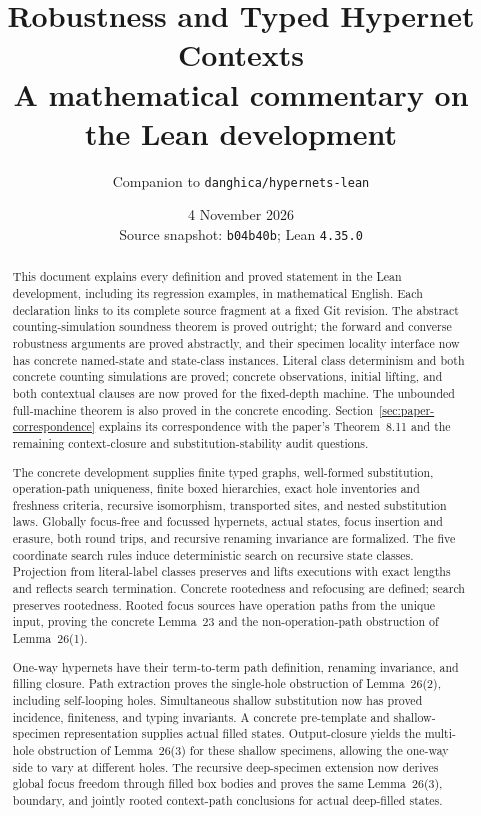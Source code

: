 \documentclass[11pt,a4paper]{article}
\title{Robustness and Typed Hypernet Contexts\\\large A mathematical commentary on the Lean development}
\author{Companion to \texttt{danghica/hypernets-lean}}
\date{4 November 2026\\\small Source snapshot: \texttt{b04b40b}; Lean \texttt{4.35.0}}
\theoremstyle{definition}
\theoremstyle{plain}
\theoremstyle{remark}
\begin{document}
\maketitle
\begin{abstract}
This document explains every definition and proved statement in the Lean development, including its regression examples, in mathematical English. Each declaration links to its complete source fragment at a fixed Git revision. The abstract counting-simulation soundness theorem is proved outright; the forward and converse robustness arguments are proved abstractly, and their specimen locality interface now has concrete named-state and state-class instances. Literal class determinism and both concrete counting simulations are proved; concrete observations, initial lifting, and both contextual clauses are now proved for the fixed-depth machine. The unbounded full-machine theorem is also proved in the concrete encoding. Section~\ref{sec:paper-correspondence} explains its correspondence with the paper's Theorem~8.11 and the remaining context-closure and substitution-stability audit questions.

The concrete development supplies finite typed graphs, well-formed substitution, operation-path uniqueness, finite boxed hierarchies, exact hole inventories and freshness criteria, recursive isomorphism, transported sites, and nested substitution laws. Globally focus-free and focussed hypernets, actual states, focus insertion and erasure, both round trips, and recursive renaming invariance are formalized. The five coordinate search rules induce deterministic search on recursive state classes. Projection from literal-label classes preserves and lifts executions with exact lengths and reflects search termination. Concrete rootedness and refocusing are defined; search preserves rootedness. Rooted focus sources have operation paths from the unique input, proving the concrete Lemma~23 and the non-operation-path obstruction of Lemma~26(1).

One-way hypernets have their term-to-term path definition, renaming invariance, and filling closure. Path extraction proves the single-hole obstruction of Lemma~26(2), including self-looping holes. Simultaneous shallow substitution now has proved incidence, finiteness, and typing invariants. A concrete pre-template and shallow-specimen representation supplies actual filled states. Output-closure yields the multi-hole obstruction of Lemma~26(3) for these shallow specimens, allowing the one-way side to vary at different holes. The recursive deep-specimen extension now derives global focus freedom through filled box bodies and proves the same Lemma~26(3), boundary, and jointly rooted context-path conclusions for actual deep-filled states.


\end{abstract}
\end{document}

